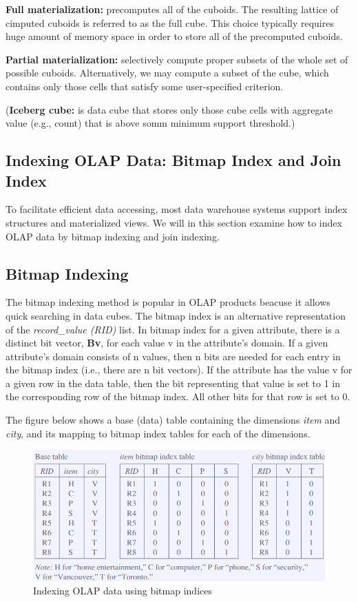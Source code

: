 		{\bf Full materialization:} precomputes all of the cuboids. The resulting lattice 
		of cimputed cuboids is referred to as the full cube. This choice typically requires 
		huge amount of memory space in order to store all of the precomputed cuboids.

		{\bf Partial materialization:} selectively compute proper subsets of the whole set of
		possible cuboids. Alternatively, we may compute a subset of the cube, which contains
		only those cells that satisfy some user-specified criterion.

		({\bf Iceberg cube:} is data cube that stores only those cube cells with aggregate 
		value (e.g., count) that is above somm minimum support threshold.)

	\clearpage
	\subsection{Indexing OLAP Data: Bitmap Index and Join Index}

		To facilitate efficient data accessing, most data warehouse systems support index
		structures and materialized views. We will in this section examine how to index
		OLAP data by bitmap indexing and join indexing. 

		\subsection*{Bitmap Indexing}

			The bitmap indexing method is popular in OLAP products beacuse it allows quick
			searching in data cubes. The bitmap index is an alternative representation
			of the {\it record\_value (RID)} list. In bitmap index for a given attribute, 
			there is a distinct bit vector, {\bf Bv}, for each value v in the attribute's domain.
			If a given attribute's domain consists of n values, then n bits are needed for each
			entry in the bitmap index (i.e., there are n bit vectors). If the attribute has the 
			value v for a given row in the data table, then the bit representing that value is
			set to 1 in the corresponding row of the bitmap index. All other bits for that row
			is set to 0. 

			The figure below shows a base (data) table containing the dimensions {\it item} and
			{\it city}, and its mapping to bitmap index tables for each of the dimensions. 
			
			\begin{figure}[H]
				\centering
				\includegraphics[scale=0.5]{pics/bitmap.png}
				\caption{Indexing OLAP data using bitmap indices}
			\end{figure} 

